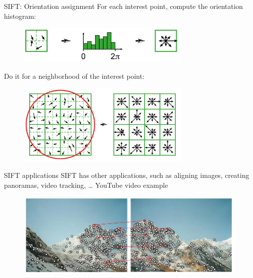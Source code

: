 \documentclass{beamer}
\newcommand{\1}[1]{\mathbbm{1}\left[#1\right]}
\begin{document}
\begin{frame}{SIFT: Orientation assignment}
For each interest point, compute the orientation histogram:
\begin{figure}
\centering
\includegraphics[width=0.75\textwidth]{images/sift_histogram.png}
\end{figure}
Do it for a neighborhood of the interest point:
\begin{figure}
\centering
\includegraphics[width=0.75\textwidth]{images/sift_features.png}
\end{figure}
\end{frame}

\begin{frame}{SIFT applications}
SIFT has other applications, such as aligning images, creating panoramas, video tracking, \ldots
\pause
\vfill
YouTube video example
\pause
\vfill
\begin{figure}
\centering
\includegraphics[width=\textwidth]{images/sift_panorama_matching.png}
\end{figure}
\end{frame}
\end{document}
